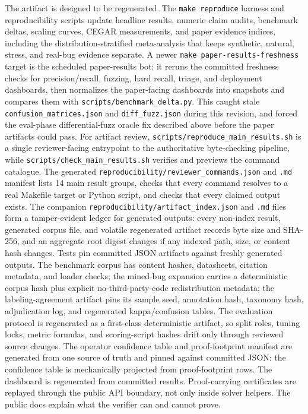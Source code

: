 \documentclass[11pt]{article}
\begin{document}
The artifact is designed to be regenerated.  The \texttt{make reproduce}
harness and reproducibility scripts update headline results, numeric claim
audits, benchmark deltas, scaling curves, CEGAR measurements, and paper evidence
indices, including the distribution-stratified meta-analysis that keeps
synthetic, natural, stress, and real-bug evidence separate.  A newer
\texttt{make paper-results-freshness} target is the scheduled paper-results bot:
it reruns the committed freshness checks for precision/recall, fuzzing, hard
recall, triage, and deployment dashboards, then normalizes the paper-facing
dashboards into snapshots and compares them with
\texttt{scripts/benchmark\_delta.py}.  This caught stale
\texttt{confusion\_matrices.json} and \texttt{diff\_fuzz.json} during this
revision, and forced the eval-phase differential-fuzz oracle fix described
above before the paper artifacts could pass.  For artifact review,
\texttt{scripts/reproduce\_main\_results.sh} is a
single reviewer-facing entrypoint to the authoritative byte-checking pipeline,
while \texttt{scripts/check\_main\_results.sh} verifies and previews the command
catalogue.  The generated \texttt{reproducibility/reviewer\_commands.json} and
\texttt{.md} manifest lists 14 main result groups, checks that every command
resolves to a real Makefile target or Python script, and checks that every
claimed output exists.  The companion
\texttt{reproducibility/artifact\_index.json} and \texttt{.md} files form a
tamper-evident ledger for generated outputs: every non-index result, generated
corpus file, and volatile regenerated artifact records byte size and SHA-256,
and an aggregate root digest changes if any indexed path, size, or content hash
changes.  Tests pin committed JSON artifacts against freshly generated outputs.
The benchmark corpus has content hashes, datasheets, citation metadata, and
loader checks; the mined-bug expansion carries a deterministic corpus hash plus
explicit no-third-party-code redistribution metadata; the labeling-agreement
artifact pins its sample seed, annotation hash, taxonomy hash, adjudication log,
and regenerated kappa/confusion tables.  The evaluation protocol
is regenerated as a first-class deterministic artifact, so split roles, tuning
locks, metric formulas, and scoring-script hashes drift only through reviewed
source changes.  The operator confidence table and proof-footprint manifest are
generated from one source of truth and pinned against committed JSON: the
confidence table is mechanically projected from proof-footprint rows.  The dashboard is
regenerated from committed results.  Proof-carrying certificates are replayed
through the public API boundary, not only inside solver helpers.  The public docs
explain what the verifier can and cannot prove.
\end{document}
